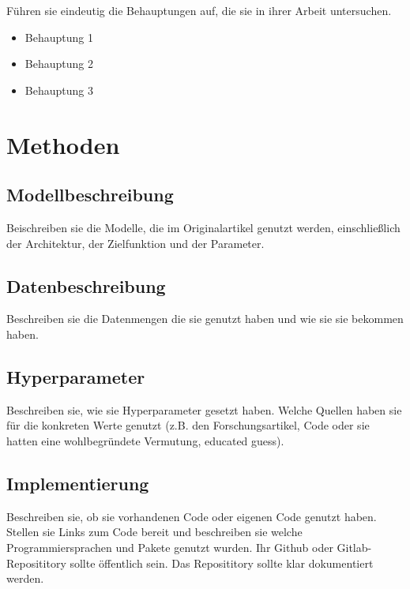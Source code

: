 \documentclass[DIV=13,fontsize=11pt]{scrartcl}
\begin{document}
Führen sie eindeutig die Behauptungen auf, die sie in ihrer Arbeit untersuchen.
\begin{itemize}
    \item Behauptung 1
    \item Behauptung 2
    \item Behauptung 3
\end{itemize}

\section{Methoden}


\subsection{Modellbeschreibung}
Beischreiben sie die Modelle, die im Originalartikel genutzt werden, einschließlich der Architektur, der Zielfunktion und der Parameter.

\subsection{Datenbeschreibung}
Beschreiben sie die Datenmengen die sie genutzt haben und wie sie sie bekommen haben.

\subsection{Hyperparameter}
Beschreiben sie, wie sie Hyperparameter gesetzt haben. Welche Quellen haben sie für die konkreten Werte genutzt (z.B. den Forschungsartikel, Code oder sie hatten eine wohlbegründete Vermutung, educated guess).

\subsection{Implementierung}
Beschreiben sie, ob sie vorhandenen Code oder eigenen Code genutzt haben.
Stellen sie Links zum Code bereit und beschreiben sie welche Programmiersprachen und Pakete genutzt wurden.
Ihr Github oder Gitlab-Reposititory sollte öffentlich sein.
Das Reposititory sollte klar dokumentiert werden.
\end{document}
